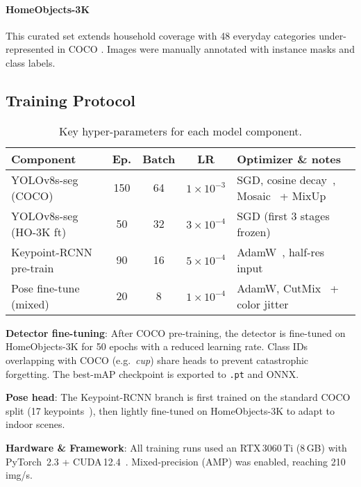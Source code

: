 \paragraph*{HomeObjects-3K} This curated set extends household coverage
with 48 everyday categories under-represented in COCO \cite{tangaro2025homeobjects3k}.  
Images were manually annotated with instance masks and class labels.

\subsection{Training Protocol}
\label{ssec:train-protocol}

\begin{table}[ht]
    \small
    \setlength{\tabcolsep}{3pt}
    \caption{Key hyper-parameters for each model component.}
    \label{tab:hyper}
    \begin{tabularx}{\linewidth}{@{}l c c c >{\raggedright\arraybackslash}X@{}}
      \toprule
      \textbf{Component} & \textbf{Ep.} & \textbf{Batch} & \textbf{LR} &
      \textbf{Optimizer \& notes}\\
      \midrule
      YOLOv8s-seg (COCO)         & 150 & 64 & $1\times10^{-3}$ &
      SGD, cosine decay~\cite{loshchilov2016sgdr}, Mosaic~\cite{bochkovskiy2020yolov4} + MixUp~\cite{zhang2017mixup} \\
      YOLOv8s-seg (HO-3K ft)     & 50  & 32 & $3\times10^{-4}$ &
      SGD (first 3 stages frozen) \\
      \addlinespace[1pt]
      Keypoint-RCNN pre-train    & 90  & 16 & $5\times10^{-4}$ &
      AdamW~\cite{loshchilov2019decoupled}, half-res input \\
      Pose fine-tune (mixed)     & 20  & 8  & $1\times10^{-4}$ &
      AdamW, CutMix~\cite{yun2019cutmix} + color jitter \\
      \bottomrule
    \end{tabularx}
\end{table}

\textbf{Detector fine-tuning}: After COCO pre-training, the detector is
fine-tuned on HomeObjects-3K for 50 epochs with a reduced learning rate.
Class IDs overlapping with COCO (e.g.\ \textit{cup}) share heads to
prevent catastrophic forgetting. The best-mAP checkpoint is exported to
\texttt{.pt} and ONNX.

\textbf{Pose head}: The Keypoint-RCNN branch is first trained on the
standard COCO split (17 keypoints~\cite{lin2014microsoft}), then lightly
fine-tuned on HomeObjects-3K to adapt to indoor scenes.

\textbf{Hardware \& Framework}: All training runs used an RTX\,3060\,Ti
(8\,GB) with PyTorch~2.3 + CUDA\,12.4~\cite{paszke2019pytorch}. Mixed-precision
(AMP) was enabled, reaching 210\,img/s.

\FloatBarrier
